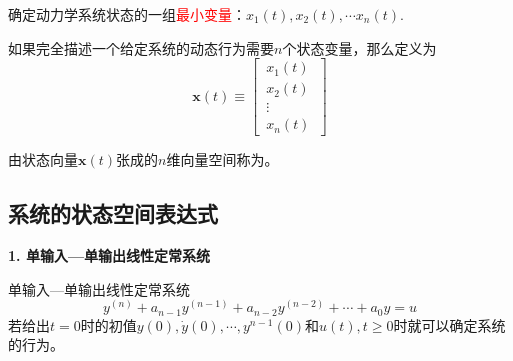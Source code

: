 确定动力学系统状态的一组\textcolor{red}{最小变量}：$x_1(t),x_2(t),\cdots x_n(t)$.
\vspace*{0.5em}

如果完全描述一个给定系统的动态行为需要$n$个状态变量，那么定义为
\begin{equation}
	\bm{x}(t) \equiv 
	\begin{bmatrix}
		\, x_1(t)\, \\
		\, x_2(t)\, \\
		\, \vdots\, \\
		\, x_n(t)\,
	\end{bmatrix}
\end{equation}

由状态向量$\bm{x}(t)$张成的$n$维向量空间称为。

\subsection{系统的状态空间表达式}
\noindent \textbf{1. 单输入—单输出线性定常系统}

单输入—单输出线性定常系统
\begin{equation}
	y^{(n)}+a_{n-1}y^{(n-1)} + a_{n-2}y^{(n-2)} + \cdots +a_0 y = u
	\label{单输入输出}
\end{equation}
若给出$t=0$时的初值$y(0), \dot{y}(0), \cdots , y^{n-1}(0)$和$u(t),t \ge 0$时就可以确定系统的行为。

